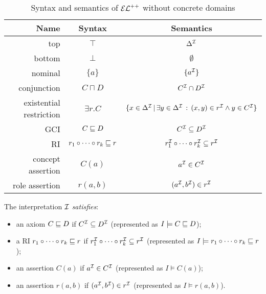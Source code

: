\begin{table}
	\centering
	\begin{tabular}{@{}rcc@{}}
		\toprule
		Name                    & Syntax                              & Semantics                                                                                        \\
		\midrule
		top                     & $\top$                              & $\Delta^{\mathcal{I}}$                                                                                      \\
		bottom                  & $\bot$                              & $\emptyset$                                                                                      \\
		nominal                 & $\{a\}$                             & $\{a^{\mathcal{I}}\}$                                                                                       \\
		conjunction             & $C \sqcap D$                        & $C^{\mathcal{I}} \cap D^{\mathcal{I}}$                                                                                 \\
		existential restriction & $\exists r.C$                       & $\{ x \in \Delta^{\mathcal{I}} \, | \, \exists y \in \Delta^{\mathcal{I}} \, : \, (x, y) \in r^{\mathcal{I}} \land y \in C^{\mathcal{I}} \}$ \\
		GCI                     & $C \sqsubseteq D$                          & $C^{\mathcal{I}} \subseteq D^{\mathcal{I}}$                                                                            \\
		RI                      & $r_1 \circ \cdots \circ r_k \sqsubseteq r$ & $r_1^{\mathcal{I}} \circ \cdots \circ r_k^{\mathcal{I}} \subseteq r^{\mathcal{I}}$                                                \\
		concept assertion       & $C(a)$                              & $a^{\mathcal{I}} \in C^{\mathcal{I}}$                                                                                  \\
		role assertion          & $r(a, b)$                           & $(a^{\mathcal{I}}, b^{\mathcal{I}}) \in r^{\mathcal{I}}$                                                                          \\
		\bottomrule
	\end{tabular}
	\caption{Syntax and semantics of $\mathcal{EL}^{++}$ without concrete domains}
	\label{table:elpp-syntax-semant}
\end{table}

The interpretation $\mathcal{I}$ \emph{satisfies}:
\begin{itemize}
	\item an axiom $C \sqsubseteq D$ if $C^{\mathcal{I}} \subseteq D^{\mathcal{I}}$ (represented as $I \models C \sqsubseteq D$);

	\item a RI $r_1 \circ \cdots \circ r_k \sqsubseteq r$ if $r_1^{\mathcal{I}} \circ \cdots \circ r_k^{\mathcal{I}} \subseteq r^{\mathcal{I}}$ (represented as $I \models r_1 \circ \cdots \circ r_k \sqsubseteq r$);

	\item an assertion $C(a)$ if $a^{\mathcal{I}} \in C^{\mathcal{I}}$ (represented as $I \models C(a)$);

	\item an assertion $r(a, b)$ if $(a^{\mathcal{I}}, b^{\mathcal{I}}) \in r^{\mathcal{I}}$ (represented as $I \models r(a, b)$).
\end{itemize}

